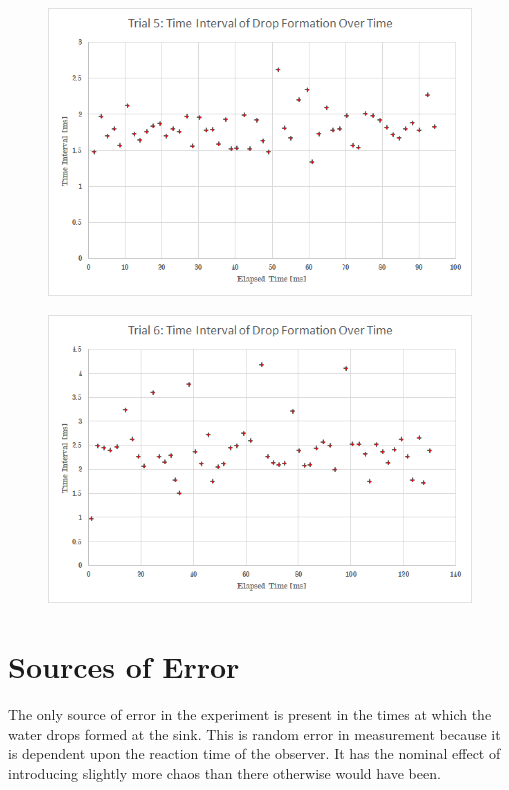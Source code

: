 \documentclass[a4paper]{article}
\begin{document}
\begin{figure}[H]
\centering
\begin{minipage}{.5\textwidth}
  \centering
  \includegraphics[width=\linewidth]{sink5.png}
  \label{fig:test1}
\end{minipage}%
\begin{minipage}{.5\textwidth}
  \centering
  \includegraphics[width=\linewidth]{sink6.png}
  \label{fig:test2}
\end{minipage}
\end{figure}

\section{Sources of Error}

\qq The only source of error in the experiment is present in the times at which
the water drops formed at the sink. This is random error in measurement because
it is dependent upon the reaction time of the observer. It has the nominal
effect of introducing slightly more chaos than there otherwise would have been. 
\end{document}
